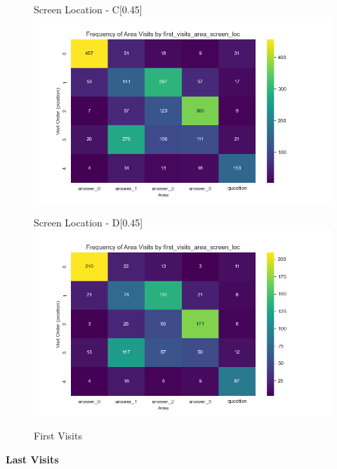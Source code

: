 \documentclass{article}
\begin{document}
\begin{figure}[H]
  \begin{subcaptionbox}{Screen Location - C\label{fig:sl_c}}[0.45\textwidth]
    {\centering\includegraphics[width=\linewidth]{plots/visits/matrix__first_visits_area_screen_loc_hunters_C.png}}
  \end{subcaptionbox}
  \hfill
  \begin{subcaptionbox}{Screen Location - D\label{fig:sl_d}}[0.45\textwidth]
    {\centering\includegraphics[width=\linewidth]{plots/visits/matrix__first_visits_area_screen_loc_hunters_D.png}}
  \end{subcaptionbox}
  
  \caption{First Visits}
  \label{fig:fourimages2}
\end{figure}



\newpage
\textbf{Last Visits}
\end{document}
